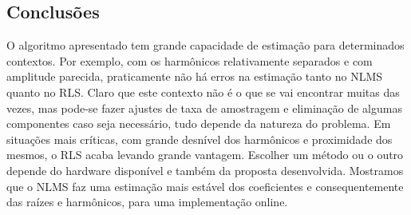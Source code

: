 \subsection{Conclusões}
O algoritmo apresentado tem grande capacidade de estimação para determinados contextos. Por exemplo, com os harmônicos relativamente separados e com amplitude parecida, praticamente não há erros na estimação tanto no NLMS quanto no RLS. Claro que este contexto não é o que se vai encontrar muitas das vezes, mas pode-se fazer ajustes de taxa de amostragem e eliminação de algumas componentes caso seja necessário, tudo depende da natureza do problema. Em situações mais críticas, com grande desnível dos harmônicos e proximidade dos mesmos, o RLS acaba levando grande vantagem. Escolher um método ou o outro depende do hardware disponível e também da proposta desenvolvida. Mostramos que o NLMS faz uma estimação mais estável dos coeficientes e consequentemente das raízes e harmônicos, para uma implementação online.

